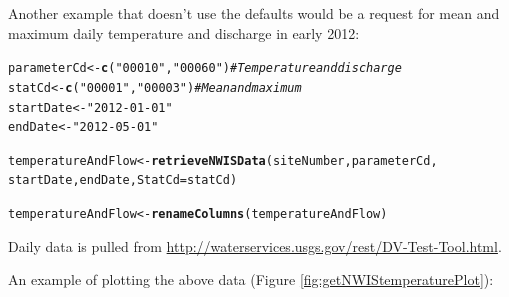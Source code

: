\documentclass[a4paper,11pt]{article}\usepackage[]{graphicx}\usepackage[]{color}
\makeatletter
\newcommand{\hlstr}[1]{\textcolor[rgb]{0.192,0.494,0.8}{#1}}%
\newcommand{\hlcom}[1]{\textcolor[rgb]{0.678,0.584,0.686}{\textit{#1}}}%
\newcommand{\hlstd}[1]{\textcolor[rgb]{0.345,0.345,0.345}{#1}}%
\newcommand{\hlkwb}[1]{\textcolor[rgb]{0.69,0.353,0.396}{#1}}%
\newcommand{\hlkwc}[1]{\textcolor[rgb]{0.333,0.667,0.333}{#1}}%
\newcommand{\hlkwd}[1]{\textcolor[rgb]{0.737,0.353,0.396}{\textbf{#1}}}%
\newenvironment{kframe}{%
 \def\at@end@of@kframe{}%
 \ifinner\ifhmode%
  \def\at@end@of@kframe{\end{minipage}}%
  \begin{minipage}{\columnwidth}%
 \fi\fi%
 \def\FrameCommand##1{\hskip\@totalleftmargin \hskip-\fboxsep
 \colorbox{shadecolor}{##1}\hskip-\fboxsep
     \hskip-\linewidth \hskip-\@totalleftmargin \hskip\columnwidth}%
 \MakeFramed {\advance\hsize-\width
   \@totalleftmargin\z@ \linewidth\hsize
   \@setminipage}}%
 {\par\unskip\endMakeFramed%
 \at@end@of@kframe}
\newenvironment{knitrout}{}{} %
\makeatother
\begin{document}
Another example that doesn't use the defaults would be a request for mean and maximum daily temperature and discharge in early 2012:
\begin{knitrout}
\color{fgcolor}\begin{kframe}
\begin{alltt}
\hlstd{parameterCd} \hlkwb{<-} \hlkwd{c}\hlstd{(}\hlstr{"00010"}\hlstd{,}\hlstr{"00060"}\hlstd{)}  \hlcom{# Temperature and discharge}
\hlstd{statCd} \hlkwb{<-} \hlkwd{c}\hlstd{(}\hlstr{"00001"}\hlstd{,}\hlstr{"00003"}\hlstd{)}  \hlcom{# Mean and maximum}
\hlstd{startDate} \hlkwb{<-} \hlstr{"2012-01-01"}
\hlstd{endDate} \hlkwb{<-} \hlstr{"2012-05-01"}

\hlstd{temperatureAndFlow} \hlkwb{<-} \hlkwd{retrieveNWISData}\hlstd{(siteNumber, parameterCd,}
        \hlstd{startDate, endDate,} \hlkwc{StatCd}\hlstd{=statCd)}

\hlstd{temperatureAndFlow} \hlkwb{<-} \hlkwd{renameColumns}\hlstd{(temperatureAndFlow)}
\end{alltt}
\end{kframe}
\end{knitrout}


Daily data is pulled from \url{http://waterservices.usgs.gov/rest/DV-Test-Tool.html}. 

An example of plotting the above data (Figure \ref{fig:getNWIStemperaturePlot}):
\end{document}
